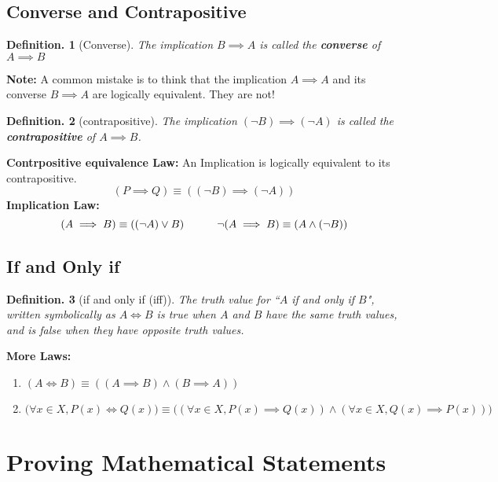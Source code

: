 \documentclass[11pt, a4paper]{memoir}
\theoremstyle{change}
\theoremstyle{plain}
\theoremstyle{nonumberplain}
\newtheorem{definition}{Definition.}
\numberwithin{equation}{section}
\begin{document}
\section{Converse and Contrapositive}
\begin{definition}[Converse]
    The implication $B \implies A$ is called the \textbf{converse} of $A \implies B$
\end{definition}
\textbf{Note: }A common mistake is to think that the implication $A \implies A$ and its converse $B \implies A$ are logically equivalent. They are not!
\begin{definition}[contrapositive]
    The implication $(\neg B) \implies (\neg A)$ is called the \textbf{contrapositive} of $A \implies B$.
\end{definition}
\textbf{Contrpositive equivalence Law:} An Implication is logically equivalent to its contrapositive. $$(P \implies Q) \equiv ((\neg B) \implies (\neg A))$$
\textbf{Implication Law:} $$(A \implies B) \equiv ((\neg A) \vee B) \hspace{7ex} \neg(A \implies B) \equiv (A \wedge (\neg B))$$

\section{If and Only if}
\begin{definition}[if and only if (iff)]
    The truth value for “$A$ if and only if $B$", written symbolically as $A \iff B$ is true when $A$ and $B$ have the 
    same truth values, and is false when they have opposite truth values.
\end{definition}
\textbf{More Laws:} 
\begin{enumerate}
    \item $(A \iff B) \equiv ((A \implies B) \wedge (B \implies A))$
    \item $\big(\forall x \in X, P(x) \iff Q(x)\big) \equiv \big((\forall x \in X, P(x) \implies Q(x)) \wedge (\forall x \in X, Q(x) \implies P(x))\big)$
\end{enumerate}

\chapter{Proving Mathematical Statements}
\end{document}
